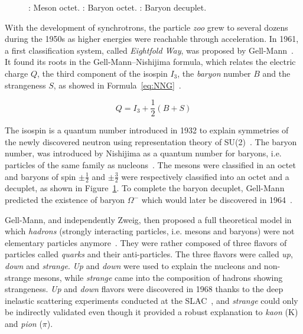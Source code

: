 \begin{figure}
\begin{minipage}{\linewidth}
			\subcaption{\label{fig:Eightfold:C}}
		\end{minipage}
		\caption{\label{fig:Eightfold} : Meson octet. : Baryon octet. : Baryon decuplet.}
		\vspace{-5pt}
	\end{figure}
	
	With the development of synchrotrons, the particle \textit{zoo} grew to several dozens during the 1950s as higher energies were reachable through acceleration. In 1961, a first classification system, called \textit{Eightfold Way}, was proposed by Gell-Mann~\cite{GELLMANN1962}. It found its roots in the Gell-Mann--Nishijima formula, which relates the electric charge $Q$, the third component of the isospin $I_3$, the \textit{baryon} number $B$ and the strangeness $S$, as showed in Formula~\ref{eq:NNG}~\cite{NISHIJIMA1953,NISHIJIMA1955,GELLMANN1956}.
	
	\begin{equation}
		\label{eq:NNG}
		Q = I_3 + \frac{1}{2}(B+S)
	\end{equation}
	
	The isospin is a quantum number introduced in 1932 to explain symmetries of the newly discovered neutron using representation theory of SU(2)~\cite{HEISENBERG1932}. The baryon number, was introduced by Nishijima as a quantum number for baryons, i.e. particles of the same family as nucleons~\cite{NISHIJIMA1953}. The mesons were classified in an octet and baryons of spin $\pm\frac{1}{2}$ and $\pm\frac{3}{2}$ were respectively classified into an octet and a decuplet, as shown in Figure~\ref{fig:Eightfold}. To complete the baryon decuplet, Gell-Mann predicted the existence of baryon $\Omega^-$ which would later be discovered in 1964~\cite{BARNES1964}.
	
	Gell-Mann, and independently Zweig, then proposed a full theoretical model in which \textit{hadrons} (strongly interacting particles, i.e. mesons and baryons) were not elementary particles anymore~\cite{GELLMANN1964,ZWEIG1964I,ZWEIG1964II}. They were rather composed of three flavors of particles called \textit{quarks} and their anti-particles. The three flavors were called \textit{up}, \textit{down} and \textit{strange}. \textit{Up} and \textit{down} were used to explain the nucleons and non-strange mesons, while \textit{strange} came into the composition of hadrons showing strangeness. \textit{Up} and \textit{down} flavors were discovered in 1968 thanks to the deep inelastic scattering experiments conducted at the \acf{SLAC}~\cite{BLOOM1969,BREIDENBACH1969}, and \textit{strange} could only be indirectly validated even though it provided a robust explanation to \textit{kaon} (K) and \textit{pion} ($\pi$).
	

